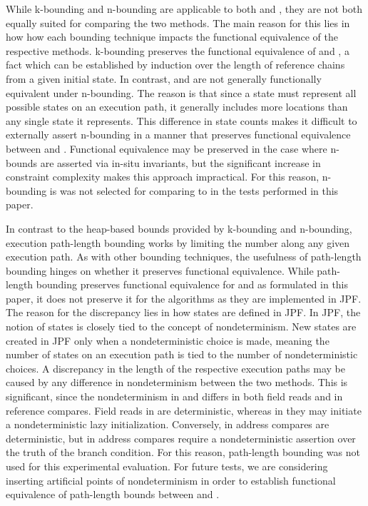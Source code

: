 While k-bounding and n-bounding are applicable to both \gsetxt{} and \symtxt{}, they are not both equally suited for comparing the two methods. The main reason for this lies in how how each bounding technique impacts the functional equivalence of the respective methods.  k-bounding preserves the functional equivalence of \gsetxt{} and \symtxt{}, a fact which can be established by induction over the length of reference chains from a given initial state. In contrast, \gsetxt{} and \symtxt{} are not generally functionally equivalent under n-bounding. The reason is that since a \symtxt{} state must represent all possible \gsetxt{} states on an execution path, it generally includes more locations than any single \gsetxt{} state it represents. This difference in state counts makes it difficult to externally assert n-bounding in a manner that preserves functional equivalence between \gsetxt{} and \symtxt{}. Functional equivalence may be preserved in the case where n-bounds are asserted via in-situ invariants, but the significant increase in constraint complexity makes this approach impractical. For this reason, n-bounding is was not selected for comparing \gsetxt{} to \symtxt{} in the tests performed in this paper.

In contrast to the heap-based bounds provided by k-bounding and n-bounding, execution path-length bounding works by limiting the number along any given execution path. As with other bounding techniques, the usefulness of path-length bounding hinges on whether it preserves functional equivalence. While path-length bounding preserves functional equivalence for \gsetxt{} and \symtxt{} as formulated in this paper, it does not preserve it for the algorithms as they are implemented in JPF. The reason for the discrepancy lies in how states are defined in JPF. In JPF, the notion of states is closely tied to the concept of nondeterminism. New states are created in JPF only when a nondeterministic choice is made, meaning the number of states on an execution path is tied to the number of nondeterministic choices. A discrepancy in the length of the respective execution paths may be caused by any difference in nondeterminism between the two methods. This is significant, since the nondeterminism in \symtxt{} and \gsetxt{} differs in both field reads and in reference compares. Field reads in \symtxt{} are deterministic, whereas in \gsetxt{} they may initiate a nondeterministic lazy initialization. Conversely, in \gsetxt{} address compares are deterministic, but in \symtxt{} address compares require a nondeterministic assertion over the truth of the branch condition. For this reason, path-length bounding was not used for this experimental evaluation. For future tests, we are considering inserting artificial points of nondeterminism in order to establish functional equivalence of path-length bounds between \gsetxt{} and \symtxt{}. 

